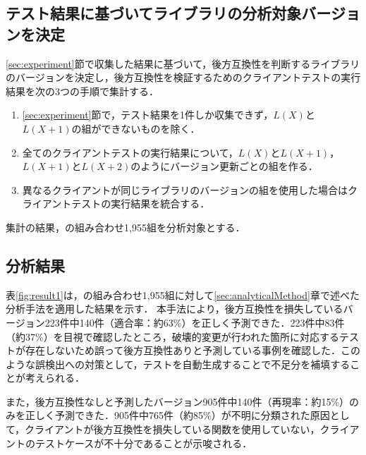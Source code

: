 \documentclass[submit]{ipsj}
\begin{document}
\subsection{テスト結果に基づいてライブラリの分析対象バージョンを決定}

\ref{sec:experiment}節で収集した結果に基づいて，後方互換性を判断するライブラリのバージョンを決定し，後方互換性を検証するためのクライアントテストの実行結果を次の3つの手順で集計する．
\begin{enumerate}
  \item \ref{sec:experiment}節で，テスト結果を1件しか収集できず，$L(X)$と$L(X+1)$の組ができないものを除く．
  \item 全てのクライアントテストの実行結果について，$L(X)$と$L(X+1)$，$L(X+1)$と$L(X+2)$のようにバージョン更新ごとの組を作る．
  \item 異なるクライアントが同じライブラリのバージョンの組を使用した場合はクライアントテストの実行結果を統合する．
\end{enumerate}
集計の結果，\textcolor{red}{}の組み合わせ1,955組を分析対象とする．

\subsection{分析結果}


表\ref{fig:result1}は，\textcolor{red}{}の組み合わせ1,955組に対して\ref{sec:analyticalMethod}章で述べた分析手法を適用した結果を示す．
本手法により，後方互換性を損失しているバージョン223件中140件（適合率：約63\%）を正しく予測できた．223件中83件（約37\%）を目視で確認したところ，破壊的変更が行われた箇所に対応するテストが存在しないため誤って後方互換性ありと予測している事例を確認した．このような誤検出への対策として，テストを自動生成することで不足分を補填することが考えられる．

また，後方互換性なしと予測したバージョン905件中140件（再現率：約15\%）のみを正しく予測できた．905件中765件（約85\%）が不明に分類された原因として，クライアントが後方互換性を損失している関数を使用していない，クライアントのテストケースが不十分であることが示唆される．
\end{document}
